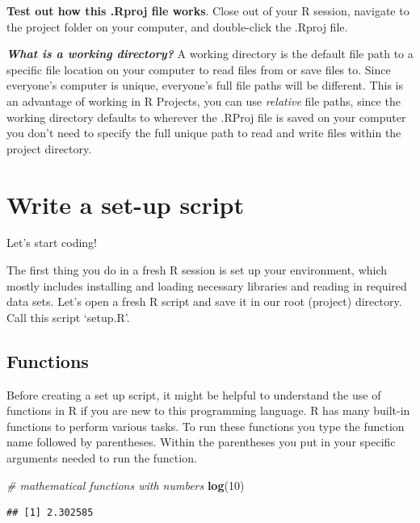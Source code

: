 \documentclass[
]{book}
\newenvironment{Shaded}{\begin{snugshade}}{\end{snugshade}}
\newcommand{\CommentTok}[1]{\textcolor[rgb]{0.56,0.35,0.01}{\textit{#1}}}
\newcommand{\DecValTok}[1]{\textcolor[rgb]{0.00,0.00,0.81}{#1}}
\newcommand{\FunctionTok}[1]{\textcolor[rgb]{0.13,0.29,0.53}{\textbf{#1}}}
\newcommand{\NormalTok}[1]{#1}
\begin{document}
\textbf{Test out how this .Rproj file works}. Close out of your R session, navigate to the project folder on your computer, and double-click the .Rproj file.

\textbf{\emph{What is a working directory?}} A working directory is the default file path to a specific file location on your computer to read files from or save files to. Since everyone's computer is unique, everyone's full file paths will be different. This is an advantage of working in R Projects, you can use \emph{relative} file paths, since the working directory defaults to wherever the .RProj file is saved on your computer you don't need to specify the full unique path to read and write files within the project directory.

\hypertarget{write-a-set-up-script}{%
\section{Write a set-up script}\label{write-a-set-up-script}}

Let's start coding!

The first thing you do in a fresh R session is set up your environment, which mostly includes installing and loading necessary libraries and reading in required data sets. Let's open a fresh R script and save it in our root (project) directory. Call this script `setup.R'.

\hypertarget{functions}{%
\subsection{Functions}\label{functions}}

Before creating a set up script, it might be helpful to understand the use of functions in R if you are new to this programming language. R has many built-in functions to perform various tasks. To run these functions you type the function name followed by parentheses. Within the parentheses you put in your specific arguments needed to run the function.

\begin{Shaded}
\begin{Highlighting}[]
\CommentTok{\# mathematical functions with numbers}
\FunctionTok{log}\NormalTok{(}\DecValTok{10}\NormalTok{)}
\end{Highlighting}
\end{Shaded}

\begin{verbatim}
## [1] 2.302585
\end{verbatim}
\end{document}

